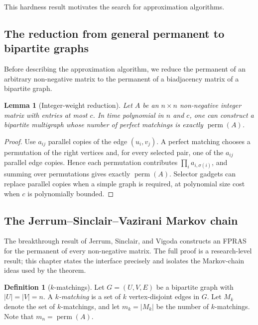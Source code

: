 \documentclass[twoside,12pt]{book}
\theoremstyle{plain}
\newtheorem{lemma}[theorem]{Lemma}
\theoremstyle{definition}
\newtheorem{definition}[theorem]{Definition}
\theoremstyle{remark}
\begin{document}
This hardness result motivates the search for approximation algorithms.

\subsection{The reduction from general permanent to bipartite graphs}

Before describing the approximation algorithm, we reduce the permanent of an arbitrary non-negative matrix to the permanent of a biadjacency matrix of a bipartite graph.

\begin{lemma}[Integer-weight reduction]
\label{lem:perm-reduction}
Let $A$ be an $n \times n$ non-negative integer matrix with entries at most
$c$. In time polynomial in $n$ and $c$, one can construct a bipartite
multigraph whose number of perfect matchings is exactly $\operatorname{perm}(A)$.
\end{lemma}

\begin{proof}
Use $a_{ij}$ parallel copies of the edge $(u_i,v_j)$. A perfect matching
chooses a permutation of the right vertices and, for every selected pair,
one of the $a_{ij}$ parallel edge copies. Hence each permutation contributes
$\prod_i a_{i,\sigma(i)}$, and summing over permutations gives exactly
$\operatorname{perm}(A)$. Selector gadgets can replace parallel copies when a
simple graph is required, at polynomial size cost when $c$ is polynomially
bounded.
\end{proof}

\subsection{The Jerrum--Sinclair--Vazirani Markov chain}

The breakthrough result of Jerrum, Sinclair, and Vigoda constructs an FPRAS
for the permanent of every non-negative matrix. The full proof is a
research-level result; this chapter states the interface precisely and
isolates the Markov-chain ideas used by the theorem.

\begin{definition}[$k$-matchings]
Let $G = (U, V, E)$ be a bipartite graph with $|U| = |V| = n$. A \emph{$k$-matching} is a set of $k$ vertex-disjoint edges in $G$. Let $M_k$ denote the set of $k$-matchings, and let $m_k = |M_k|$ be the number of $k$-matchings. Note that $m_n = \operatorname{perm}(A)$.
\end{definition}
\end{document}
